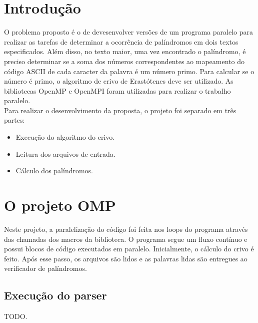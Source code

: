 \documentclass[a4paper]{article}
\begin{document}
\section{Introdução}
\indent \indent O problema proposto é o de devesenvolver versões de um programa paralelo para realizar as tarefas de determinar a ocorrência de palíndromos em dois textos especificados. Além disso, no texto maior, uma vez encontrado o palíndromo, é preciso determinar se a soma dos números correspondentes ao mapeamento do código ASCII de cada caracter da palavra é um número primo. Para calcular se o número é primo, o algoritmo de crivo de Erastótenes deve ser utilizado. As bibliotecas OpenMP e OpenMPI foram utilizadas para realizar o trabalho paralelo.\\
\indent Para realizar o desenvolvimento da proposta, o projeto foi separado em três partes:
\begin{itemize}
	\item Execução do algoritmo do crivo.
	\item Leitura dos arquivos de entrada.
	\item Cálculo dos palíndromos.
\end{itemize}

\section{O projeto OMP}
\indent \indent Neste projeto, a paralelização do código foi feita nos loops do programa através das chamadas dos macros da biblioteca. O programa segue um fluxo contínuo e possui blocos de código executados em paralelo. Inicialmente, o cálculo do crivo é feito. Após esse passo, os arquivos são lidos e as palavras lidas são entregues ao verificador de palíndromos.

\subsection{Execução do parser}
\indent \indent TODO.
\end{document}
